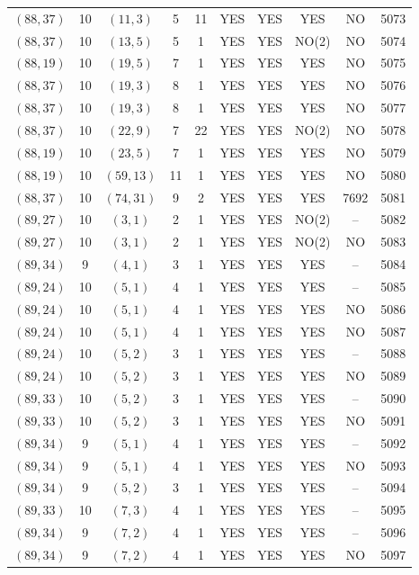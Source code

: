 \begin{longtable}{|c|c|c|c|c|c|c|c|c|c|}
$(88, 37)$ & 10 & $(11, 3)$ & 5 & 11 & YES & YES & YES & NO & 5073\\
$(88, 37)$ & 10 & $(13, 5)$ & 5 & 1 & YES & YES & NO(2) & NO & 5074\\
$(88, 19)$ & 10 & $(19, 5)$ & 7 & 1 & YES & YES & YES & NO & 5075\\
$(88, 37)$ & 10 & $(19, 3)$ & 8 & 1 & YES & YES & YES & NO & 5076\\
$(88, 37)$ & 10 & $(19, 3)$ & 8 & 1 & YES & YES & YES & NO & 5077\\
$(88, 37)$ & 10 & $(22, 9)$ & 7 & 22 & YES & YES & NO(2) & NO & 5078\\
$(88, 19)$ & 10 & $(23, 5)$ & 7 & 1 & YES & YES & YES & NO & 5079\\
$(88, 19)$ & 10 & $(59, 13)$ & 11 & 1 & YES & YES & YES & NO & 5080\\
$(88, 37)$ & 10 & $(74, 31)$ & 9 & 2 & YES & YES & YES & 7692 & 5081\\
$(89, 27)$ & 10 & $(3, 1)$ & 2 & 1 & YES & YES & NO(2) & -- & 5082\\
$(89, 27)$ & 10 & $(3, 1)$ & 2 & 1 & YES & YES & NO(2) & NO & 5083\\
$(89, 34)$ & 9 & $(4, 1)$ & 3 & 1 & YES & YES & YES & -- & 5084\\
$(89, 24)$ & 10 & $(5, 1)$ & 4 & 1 & YES & YES & YES & -- & 5085\\
$(89, 24)$ & 10 & $(5, 1)$ & 4 & 1 & YES & YES & YES & NO & 5086\\
$(89, 24)$ & 10 & $(5, 1)$ & 4 & 1 & YES & YES & YES & NO & 5087\\
$(89, 24)$ & 10 & $(5, 2)$ & 3 & 1 & YES & YES & YES & -- & 5088\\
$(89, 24)$ & 10 & $(5, 2)$ & 3 & 1 & YES & YES & YES & NO & 5089\\
$(89, 33)$ & 10 & $(5, 2)$ & 3 & 1 & YES & YES & YES & -- & 5090\\
$(89, 33)$ & 10 & $(5, 2)$ & 3 & 1 & YES & YES & YES & NO & 5091\\
$(89, 34)$ & 9 & $(5, 1)$ & 4 & 1 & YES & YES & YES & -- & 5092\\
$(89, 34)$ & 9 & $(5, 1)$ & 4 & 1 & YES & YES & YES & NO & 5093\\
$(89, 34)$ & 9 & $(5, 2)$ & 3 & 1 & YES & YES & YES & -- & 5094\\
$(89, 33)$ & 10 & $(7, 3)$ & 4 & 1 & YES & YES & YES & -- & 5095\\
$(89, 34)$ & 9 & $(7, 2)$ & 4 & 1 & YES & YES & YES & -- & 5096\\
$(89, 34)$ & 9 & $(7, 2)$ & 4 & 1 & YES & YES & YES & NO & 5097\\

\end{longtable}
